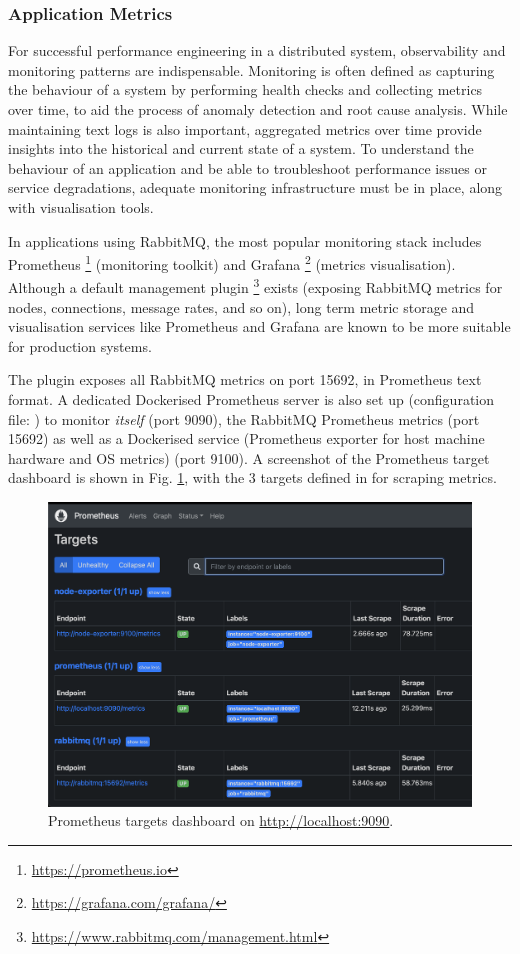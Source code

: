 \subsubsection{Application Metrics}

For successful performance engineering in a distributed system, observability and monitoring patterns are indispensable. Monitoring is often defined as capturing the behaviour of a system by performing health checks and collecting metrics over time, to aid the process of anomaly detection and root cause analysis. While maintaining text logs is also important, aggregated metrics over time provide insights into the historical and current state of a system. To understand the behaviour of an application and be able to troubleshoot performance issues or service degradations, adequate monitoring infrastructure must be in place, along with visualisation tools.

In applications using RabbitMQ, the most popular monitoring stack includes Prometheus \footnote{\url{https://prometheus.io}} (monitoring toolkit) and Grafana \footnote{\url{https://grafana.com/grafana/}} (metrics visualisation). Although a default management plugin \footnote{\url{https://www.rabbitmq.com/management.html}} exists (exposing RabbitMQ metrics for nodes, connections, message rates, and so on), long term metric storage and visualisation services like Prometheus and Grafana are known to be more suitable for production systems.

The  plugin exposes all RabbitMQ metrics on port 15692, in Prometheus text format. A dedicated Dockerised Prometheus server is also set up (configuration file: ) to monitor \textit{itself} (port 9090), the RabbitMQ Prometheus metrics (port 15692) as well as a Dockerised  service (Prometheus exporter for host machine hardware and OS metrics) (port 9100). A screenshot of the Prometheus target dashboard is shown in Fig.
\ref{fig:prom-targets}, with the 3 targets defined in  for scraping metrics.

\begin{figure}[H]
  \centering
  \includegraphics[width=0.75\linewidth]{./assets/images/case-studies/prom-targets.png}
  \caption{Prometheus targets dashboard on \url{http://localhost:9090}.}
  \label{fig:prom-targets}
\end{figure}


